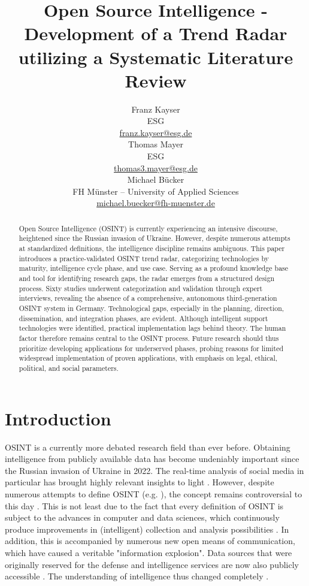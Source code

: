 \documentclass[10pt]{article}
\title{Open Source Intelligence - Development of a Trend Radar utilizing a Systematic Literature Review}
\author{Franz Kayser \\
  ESG \\
  {\underline{ franz.kayser@esg.de}} \\\And
  Thomas Mayer \\
  ESG  \\
  {\underline{ thomas3.mayer@esg.de} }\\\And 
  Michael Bücker \\
  FH Münster -- University of Applied Sciences\\
  {\underline{michael.buecker@fh-muenster.de}} \\}
\date{}
\begin{document}
\maketitle
\begin{abstract}


    Open Source Intelligence (OSINT) is currently experiencing an intensive discourse,
    heightened since the Russian invasion of Ukraine. However, despite numerous attempts
    at standardized definitions, the intelligence discipline remains ambiguous. This paper
    introduces a practice-validated OSINT trend radar, categorizing technologies by maturity,
    intelligence cycle phase, and use case. Serving as a profound knowledge base and tool for
    identifying research gaps, the radar emerges from a structured design process. Sixty
    studies underwent categorization and validation through expert interviews,
    revealing the absence of a comprehensive, autonomous third-generation OSINT
    system in Germany. Technological gaps, especially in the planning, direction,
    dissemination, and integration phases, are evident. Although intelligent support
    technologies were identified, practical implementation lags behind theory. The human
    factor therefore remains central to the OSINT process. Future research should thus
    prioritize developing applications for underserved phases, probing reasons for limited
    widespread implementation of proven applications, with emphasis on legal, ethical,
    political, and social parameters.


\end{abstract}

\section{Introduction}

OSINT is a currently more debated research field than ever before. Obtaining intelligence
from publicly available data \cite{DosPassos.2017} has become undeniably important since the
Russian invasion of Ukraine in 2022. The real-time analysis of social media in particular has
brought highly relevant insights to light \cite{Hatfield.2023, SmithBoyle.24.07.2023}. However, despite
numerous attempts to define OSINT (e.g. \cite{Hwang.2022, PastorGalindo.2020, Yogish.2021}),
the concept remains controversial to this day \cite{Ghioni.2023, Ish.2022,Williams.2018}.
This is not least due to the fact that every definition of OSINT is subject to the advances
in computer and data sciences, which continuously produce improvements in (intelligent)
collection and analysis possibilities \cite{Ghioni.2023, Williams.2018}. In addition, this is
accompanied by numerous new open means of communication, which have caused a veritable
"information explosion"\cite{DosPassos.2017, Hwang.2022, Yogish.2021}.
Data sources that were originally reserved for the defense and intelligence services are
now also publicly accessible \cite{Hwang.2022, Williams.2018}. The understanding of
intelligence thus changed completely \cite{Dokman.2020}.
\end{document}

